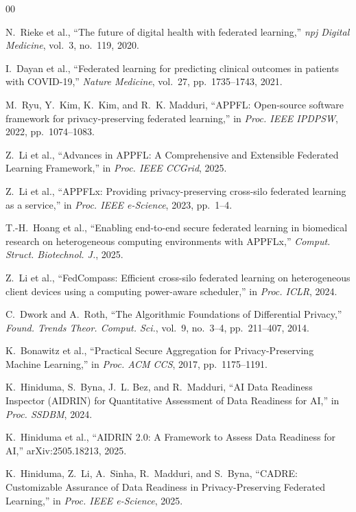 \documentclass[conference]{IEEEtran}
\begin{document}
\begin{thebibliography}{00}

N.~Rieke et al., ``The future of digital health with federated
learning,'' \emph{npj Digital Medicine}, vol.~3, no.~119, 2020.

I.~Dayan et al., ``Federated learning for predicting clinical outcomes
in patients with COVID-19,'' \emph{Nature Medicine}, vol.~27,
pp.~1735--1743, 2021.

M.~Ryu, Y.~Kim, K.~Kim, and R.~K. Madduri, ``APPFL: Open-source
software framework for privacy-preserving federated learning,'' in
\emph{Proc. IEEE IPDPSW}, 2022, pp.~1074--1083.

Z.~Li et al., ``Advances in APPFL: A Comprehensive and Extensible
Federated Learning Framework,'' in \emph{Proc. IEEE CCGrid}, 2025.

Z.~Li et al., ``APPFLx: Providing privacy-preserving cross-silo
federated learning as a service,'' in \emph{Proc. IEEE e-Science}, 2023,
pp.~1--4.

T.-H.~Hoang et al., ``Enabling end-to-end secure federated learning in
biomedical research on heterogeneous computing environments with
APPFLx,'' \emph{Comput. Struct. Biotechnol. J.}, 2025.

Z.~Li et al., ``FedCompass: Efficient cross-silo federated learning on
heterogeneous client devices using a computing power-aware scheduler,''
in \emph{Proc. ICLR}, 2024.

C.~Dwork and A.~Roth, ``The Algorithmic Foundations of Differential
Privacy,'' \emph{Found. Trends Theor. Comput. Sci.}, vol.~9, no.~3--4,
pp.~211--407, 2014.

K.~Bonawitz et al., ``Practical Secure Aggregation for
Privacy-Preserving Machine Learning,'' in \emph{Proc. ACM CCS}, 2017,
pp.~1175--1191.

K.~Hiniduma, S.~Byna, J.~L. Bez, and R.~Madduri, ``AI Data Readiness
Inspector (AIDRIN) for Quantitative Assessment of Data Readiness for
AI,'' in \emph{Proc. SSDBM}, 2024.

K.~Hiniduma et al., ``AIDRIN 2.0: A Framework to Assess Data Readiness
for AI,'' arXiv:2505.18213, 2025.

K.~Hiniduma, Z.~Li, A.~Sinha, R.~Madduri, and S.~Byna, ``CADRE:
Customizable Assurance of Data Readiness in Privacy-Preserving Federated
Learning,'' in \emph{Proc. IEEE e-Science}, 2025.


\end{thebibliography}
\end{document}
